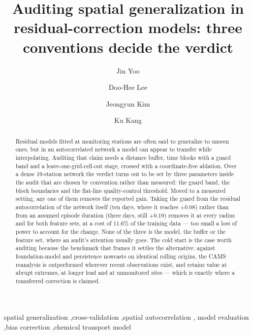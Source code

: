 \documentclass[review,times,authoryear]{elsarticle}
\begin{document}
\begin{frontmatter}

\title{Auditing spatial generalization in residual-correction models:
three conventions decide the verdict}

\author[cbrn]{Jin Yoo}
\author[cbrn]{Doo-Hee Lee}
\author[snu]{Jeongyun Kim}
\author[cbrn]{Ku Kang}


\address[cbrn]{CBRN Defense Research Institute, Korea Ministry of National Defense,
Seoul 06796, Republic of Korea}
\address[snu]{Department of Chemical and Biological Engineering, Seoul National University,
Seoul 08826, Republic of Korea}

\begin{abstract}
Residual models fitted at monitoring stations are often said to generalize to unseen ones,
but in an autocorrelated network a model can appear to transfer while interpolating.
Auditing that claim needs a distance buffer, time blocks with a guard band and a
leave-one-grid-cell-out stage, crossed with a coordinate-free ablation. Over a dense
19-station network the verdict turns out to be set by three parameters inside the audit
that are chosen by convention rather than measured: the guard band, the block boundaries
and the flat-line quality-control threshold. Moved to a measured setting, any one of them
removes the reported gain. Taking the guard from the residual autocorrelation of the
network itself (ten days, where it reaches $+0.08$) rather than from an assumed episode
duration (three days, still $+0.19$) removes it at every radius and for both feature sets,
at a cost of $11.6\%$ of the training data --- too small a loss of power to account for the
change. None of the three is the model, the buffer or the feature set, where an audit's
attention usually goes. The cold start is the case worth auditing because the benchmark
that frames it settles the alternative: against foundation-model and persistence nowcasts
on identical rolling origins, the CAMS reanalysis is outperformed wherever recent
observations exist, and retains value at abrupt extremes, at longer lead and at
unmonitored sites --- which is exactly where a transferred correction is claimed.
\end{abstract}

\begin{keyword}
spatial generalization \sep cross-validation \sep spatial autocorrelation \sep
model evaluation \sep bias correction \sep chemical transport model
\end{keyword}

\end{frontmatter}
\end{document}
